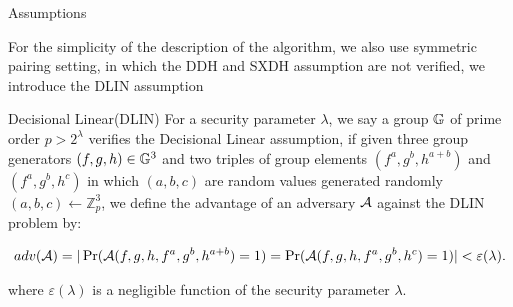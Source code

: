 \begin{subsection}{Assumptions}
  
  For the simplicity of the description of the algorithm, we also use symmetric pairing setting, in which the DDH and SXDH assumption are not verified, we introduce the DLIN assumption
  \begin{myDef}{Decisional Linear(DLIN)}
    For a security parameter $\lambda$, we say a group $\mathbb{G}$ of prime order $p>2^{\lambda}$ verifies the Decisional Linear assumption, if given three group generators $(f, g, h) \in \mathbb{G}^3$ and two triples of group elements $(f^a, g^b, h^{a+b})$ and $(f^a, g^b, h^c)$ in which $(a, b, c)$ are random values generated randomly $(a, b, c) \gets \mathbb{Z}_p^3$, we define the advantage of an adversary $\mathcal{A}$ against the DLIN problem by:

    \begin{align*}
      adv(\mathcal{A}) = |\operatorname{Pr}(\mathcal{A}(f, g, h, f^a, g^b, h^{a+b}) = 1) = \operatorname{Pr}(\mathcal{A}(f, g, h, f^a, g^b, h^c) = 1)| < \varepsilon(\lambda).
    \end{align*}

    where $\varepsilon(\lambda)$ is a negligible function of the security parameter $\lambda$.
  \end{myDef}


  

\end{subsection}




